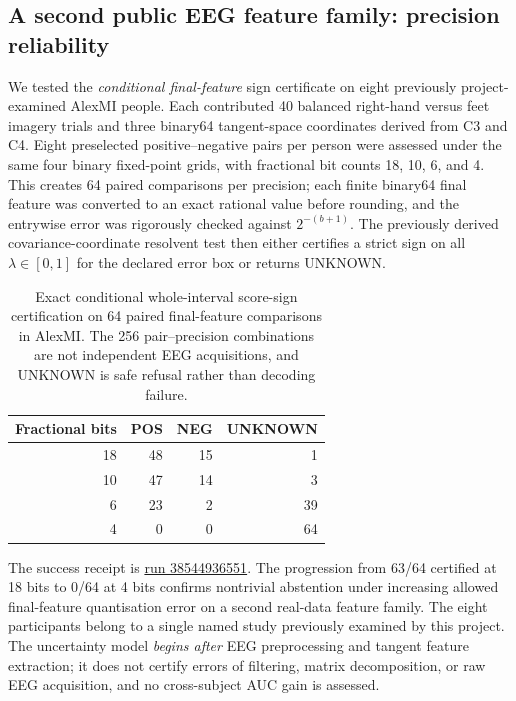 \subsection{A second public EEG feature family: precision reliability}
\label{sec:p4-alexmi-second}
We tested the \emph{conditional final-feature} sign
certificate on eight previously project-examined
AlexMI people. Each contributed 40 balanced
right-hand versus feet imagery trials and
three binary64 tangent-space coordinates
derived from C3 and C4.
Eight preselected positive--negative pairs
per person were assessed under the same four
binary fixed-point grids, with fractional bit
counts 18, 10, 6, and 4. This creates 64
paired comparisons per precision; each finite
binary64 final feature was converted to an
exact rational value before rounding, and the
entrywise error was rigorously checked against
$2^{-(b+1)}$. The previously derived
covariance-coordinate resolvent test then
either certifies a strict sign on all
$\lambda\in[0,1]$ for the declared error
box or returns UNKNOWN.

\begin{table}[ht]\centering\small
\caption{Exact conditional whole-interval
score-sign certification on 64 paired
final-feature comparisons in AlexMI.
The 256 pair--precision combinations
are not independent EEG acquisitions,
and UNKNOWN is safe refusal rather
than decoding failure.}
\label{tab:p4-alexmi-second}
\begin{tabular}{rrrr}
\toprule
Fractional bits & POS & NEG & UNKNOWN\\
\midrule
18 & 48 & 15 & 1\\
10 & 47 & 14 & 3\\
6 & 23 & 2 & 39\\
4 & 0 & 0 & 64\\
\bottomrule
\end{tabular}
\end{table}

The success receipt is
\href{https://github.com/lindicaphxag-tech/kaggle/actions/runs/38544936551}
{run 38544936551}.
The progression from 63/64 certified
at 18 bits to 0/64 at 4 bits confirms
nontrivial abstention under increasing
allowed final-feature quantisation error
on a second real-data feature family.
The eight participants belong to a
single named study previously examined
by this project. The uncertainty model
\emph{begins after} EEG preprocessing
and tangent feature extraction; it
does not certify errors of filtering,
matrix decomposition, or raw EEG
acquisition, and no cross-subject AUC
gain is assessed.